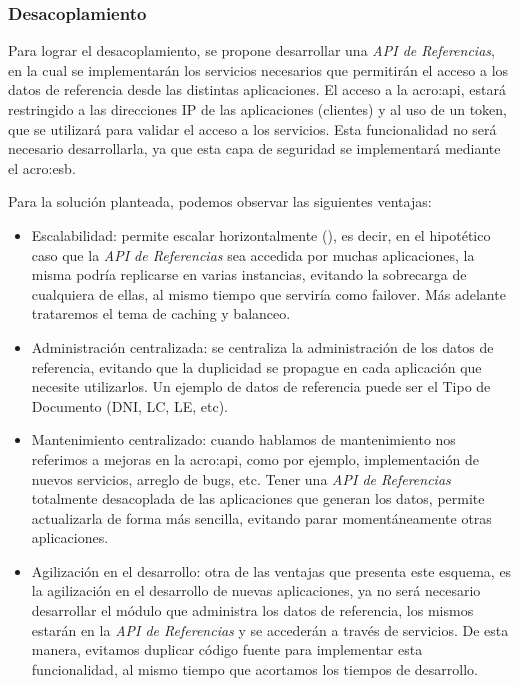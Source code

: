 \subsubsection{Desacoplamiento}

Para lograr el desacoplamiento, se propone desarrollar una \textit{API de Referencias}, en la cual se implementarán los servicios necesarios que permitirán el acceso a los datos de referencia desde las distintas aplicaciones.  El acceso a la \gls{acro:api}, estará restringido a las direcciones IP de las aplicaciones (clientes) y al uso de un token, que se utilizará para validar el acceso a los servicios.  Esta funcionalidad no será necesario desarrollarla, ya que esta capa de seguridad se implementará mediante el \gls{acro:esb}.

Para la solución planteada, podemos observar las siguientes ventajas:

\begin{itemize}
  \item Escalabilidad: permite escalar horizontalmente (), es decir, en el hipotético caso que la \textit{API de Referencias} sea accedida por muchas aplicaciones, la misma podría replicarse en varias instancias, evitando la sobrecarga de cualquiera de ellas, al mismo tiempo que serviría como failover.  Más adelante trataremos el tema de caching y balanceo.

  \item Administración centralizada: se centraliza la administración de los datos de referencia, evitando que la duplicidad se propague en cada aplicación que necesite utilizarlos.  Un ejemplo de datos de referencia puede ser el Tipo de Documento (DNI, LC, LE, etc).

  \item Mantenimiento centralizado: cuando hablamos de mantenimiento nos referimos a mejoras en la \gls{acro:api}, como por ejemplo, implementación de nuevos servicios, arreglo de bugs, etc.  Tener una \textit{API de Referencias} totalmente desacoplada de las aplicaciones que generan los datos, permite actualizarla de forma más sencilla, evitando parar momentáneamente otras aplicaciones.

  \item Agilización en el desarrollo: otra de las ventajas que presenta este esquema, es la agilización en el desarrollo de nuevas aplicaciones, ya no será necesario desarrollar el módulo que administra los datos de referencia, los mismos estarán en la \textit{API de Referencias} y se accederán a través de servicios.  De esta manera, evitamos duplicar código fuente para implementar esta funcionalidad, al mismo tiempo que acortamos los tiempos de desarrollo.
\end{itemize}

